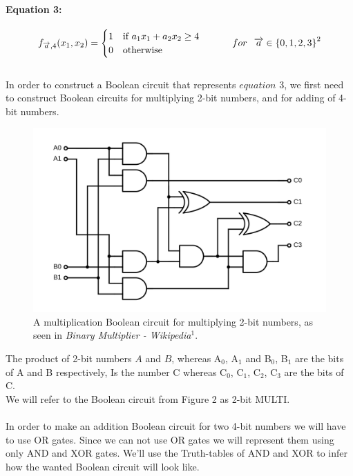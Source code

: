 \documentclass{article}
\begin{document}
\paragraph{Equation 3:}

$$
f_{\overrightarrow{a},4}(x_{1},x_{2})=\begin{cases}
			1 & \text{if $a_1x_1 + a_2x_2 \geq 4$ }\\
            0 & \text{otherwise}
		 \end{cases} \hspace{1cm} for \hspace{.25cm}  \overrightarrow{a} \in {\left\{ 0,1,2,3\right\}}^{2}
$$
\\
In order to construct a Boolean circuit that represents $equation$ $3$, we first need to construct Boolean circuits for multiplying 2-bit numbers, and for adding of 4-bit numbers.


\begin{figure}[H]
    \centering
    \includegraphics[width=1\linewidth]{1920px-Binary_multiplier.svg.png}
    \caption
    {
    A multiplication Boolean circuit for multiplying 2-bit numbers, as seen in \textit{Binary Multiplier - Wikipedia}$^{1}$.
    }
    \label{fig:enter-label}
\end{figure}


The product of 2-bit numbers $A$ and $B$, whereas A$_0$, A$_1$ and B$_0$, B$_1$ are the bits of A and B respectively, Is the number C whereas C$_0$, C$_1$, C$_2$, C$_3$ are the bits of C.
\\
We will refer to the Boolean circuit from Figure 2 as 2-bit MULTI.
\\\\
In order to make an addition Boolean circuit for two 4-bit numbers we will have to use OR gates. Since we can not use OR gates we will represent them using only AND and XOR gates. We'll use the Truth-tables of AND and XOR to infer how the wanted Boolean circuit will look like. 
\end{document}
